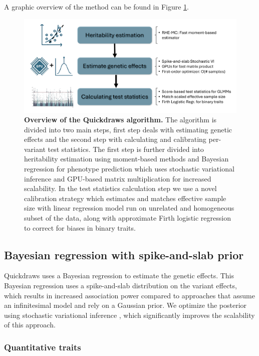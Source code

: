 A graphic overview of the method can be found in Figure \ref{fig:qd_overview}.

\begin{figure}
    \centering
    \includegraphics[width=\linewidth]{figures/thesis_qd_overview.pdf}
    \caption{\textbf{Overview of the Quickdraws algorithm.} The algorithm is divided into two main steps, first step deals with estimating genetic effects and the second step with calculating and calibrating per-variant test statistics. The first step is further divided into heritability estimation using moment-based methods \cite{kalantzis2023thesis, zhu2024ARGRHE} and Bayesian regression for phenotype prediction which uses stochastic variational inference and GPU-based matrix multiplication for increased scalability. In the test statistics calculation step we use a novel calibration strategy which estimates and matches effective sample size with linear regression model run on unrelated and homogeneous subset of the data, along with approximate Firth logistic regression to correct for biases in binary traits.}
    \label{fig:qd_overview}
\end{figure}

\subsection{Bayesian regression with spike-and-slab prior }
\label{sec:ch4-blr}
%
Quickdraws uses a Bayesian regression to estimate the genetic effects.
%
This Bayesian regression uses a spike-and-slab distribution on the variant effects, which results in increased association power compared to approaches that assume an infinitesimal model and rely on a Gaussian prior.
%
We optimize the posterior using stochastic variational inference \cite{hoffman2013stochastic}, which significantly improves the scalability of this approach.
%

\subsubsection{Quantitative traits}

